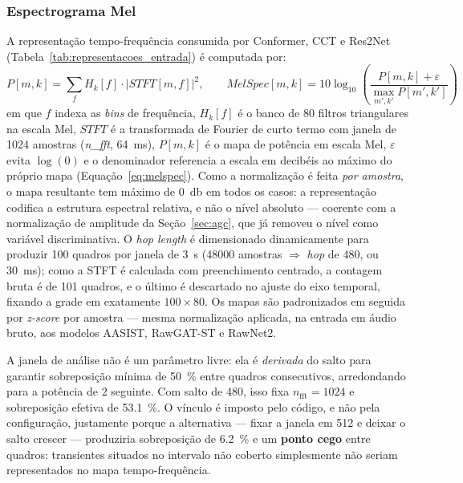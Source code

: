 \documentclass[12pt,a4paper]{article}
\begin{document}
\subsubsection*{Espectrograma Mel}

A representação tempo-frequência consumida por Conformer, CCT e Res2Net
(Tabela~\ref{tab:representacoes_entrada}) é computada por:
\begin{equation}
	\label{eq:melspec}
	P[m,k] = \sum_{f}H_k[f]\cdot|STFT[m,f]|^2,
	\qquad
	MelSpec[m,k] = 10\log_{10}\!\left(\frac{P[m,k] +
		\varepsilon}{\max_{m',k'} P[m',k']}\right)
\end{equation}
\noindent
em que $f$ indexa as \textit{bins} de frequência, $H_k[f]$ é o banco de
$80$ filtros triangulares na escala Mel, $STFT$ é a transformada de Fourier
de curto termo com janela de \num{1024} amostras (\textit{n\_fft},
\SI{64}{\milli\second}),
$P[m,k]$ é o mapa de potência em escala Mel, $\varepsilon$ evita $\log(0)$ e o
denominador referencia a escala em decibéis ao máximo do próprio mapa
(Equação~\ref{eq:melspec}). Como a normalização é feita \emph{por amostra}, o
mapa resultante tem máximo de \SI{0}{\decibel} em todos os casos: a representação
codifica a estrutura espectral relativa, e não o nível absoluto --- coerente
com a normalização de amplitude da Seção~\ref{sec:agc}, que já removeu o nível
como variável discriminativa. O \textit{hop length} é dimensionado
dinamicamente para produzir \num{100} quadros por janela de
\SI{3}{\second} (\num{48000} amostras $\Rightarrow$ \textit{hop} de
\num{480}, ou \SI{30}{\milli\second}); como a STFT é calculada com
preenchimento centrado, a contagem bruta é de \num{101} quadros, e o último é
descartado no ajuste do eixo temporal, fixando a grade em exatamente
$100 \times 80$. Os mapas são padronizados em seguida por \textit{z-score} por
amostra --- mesma normalização aplicada, na entrada em áudio bruto, aos modelos
AASIST, RawGAT-ST e RawNet2.

A janela de análise não é um parâmetro livre: ela é \emph{derivada} do salto
para garantir sobreposição mínima de \SI{50}{\percent} entre quadros
consecutivos, arredondando para a potência de $2$ seguinte. Com salto de
\num{480}, isso fixa $n_{\mathrm{fft}} = \num{1024}$ e sobreposição efetiva de
\SI{53,1}{\percent}. O vínculo é imposto pelo código, e não pela configuração,
justamente porque a alternativa --- fixar a janela em \num{512} e deixar o
salto crescer --- produziria sobreposição de \SI{6,2}{\percent} e um
\textbf{ponto cego} entre quadros: transientes situados no intervalo não
coberto simplesmente não seriam representados no mapa tempo-frequência.
\end{document}
